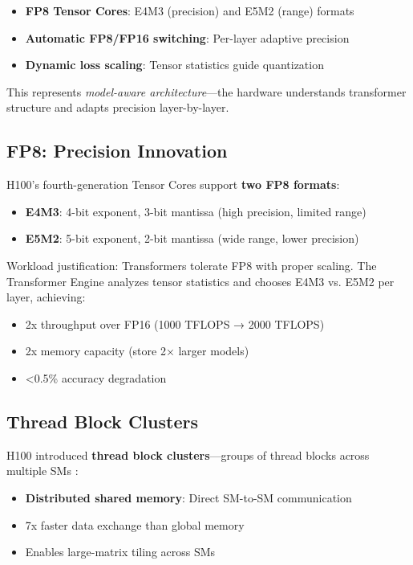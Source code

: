 \documentclass{article}
\begin{document}
\begin{itemize}
\item \textbf{FP8 Tensor Cores}: E4M3 (precision) and E5M2 (range) formats
\item \textbf{Automatic FP8/FP16 switching}: Per-layer adaptive precision
\item \textbf{Dynamic loss scaling}: Tensor statistics guide quantization
\end{itemize}

This represents \textit{model-aware architecture}—the hardware understands transformer structure and adapts precision layer-by-layer.

\subsection{FP8: Precision Innovation}

H100's fourth-generation Tensor Cores support \textbf{two FP8 formats}:
\begin{itemize}
\item \textbf{E4M3}: 4-bit exponent, 3-bit mantissa (high precision, limited range)
\item \textbf{E5M2}: 5-bit exponent, 2-bit mantissa (wide range, lower precision)
\end{itemize}

Workload justification: Transformers tolerate FP8 with proper scaling. The Transformer Engine analyzes tensor statistics and chooses E4M3 vs. E5M2 per layer, achieving:
\begin{itemize}
\item 2x throughput over FP16 (1000 TFLOPS → 2000 TFLOPS)
\item 2x memory capacity (store 2× larger models)
\item <0.5\% accuracy degradation
\end{itemize}

\subsection{Thread Block Clusters}

H100 introduced \textbf{thread block clusters}—groups of thread blocks across multiple SMs \cite{nvidia2022hopper}:
\begin{itemize}
\item \textbf{Distributed shared memory}: Direct SM-to-SM communication
\item 7x faster data exchange than global memory
\item Enables large-matrix tiling across SMs
\end{itemize}
\end{document}
